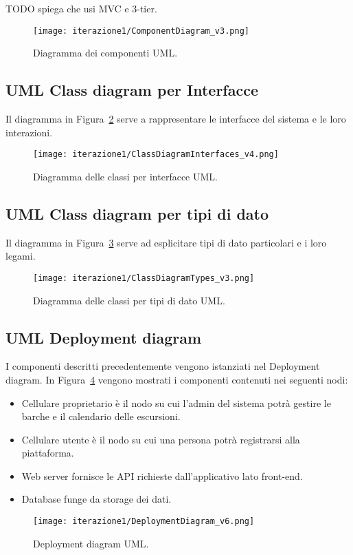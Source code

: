TODO spiega che usi MVC e 3-tier.

\begin{figure}[htbp]
    \texttt{[image: iterazione1/ComponentDiagram\_v3.png]}
    \centering
    \caption{Diagramma dei componenti UML.}\label{fig:componentDiagram}
\end{figure}

\newpage

\subsection{UML Class diagram per Interfacce}
Il diagramma in Figura~\ref{fig:ClassDiagramInterfaces} serve a rappresentare le interfacce del sistema e le loro interazioni.

\begin{figure}[htbp]
    \texttt{[image: iterazione1/ClassDiagramInterfaces\_v4.png]}
    \centering
    \caption{Diagramma delle classi per interfacce UML.}\label{fig:ClassDiagramInterfaces}
\end{figure}

\newpage

\subsection{UML Class diagram per tipi di dato}
Il diagramma in Figura~\ref{fig:ClassDiagramTypes} serve ad esplicitare tipi di dato particolari e i loro legami.

\begin{figure}[htbp]
    \texttt{[image: iterazione1/ClassDiagramTypes\_v3.png]}
    \centering
    \caption{Diagramma delle classi per tipi di dato UML.}\label{fig:ClassDiagramTypes}
\end{figure}

\subsection{UML Deployment diagram}
I componenti descritti precedentemente vengono istanziati nel Deployment diagram. In Figura~\ref{fig:DeploymentDiagram} vengono mostrati i componenti contenuti nei seguenti nodi:

\begin{itemize}
    \item Cellulare proprietario è il nodo su cui l'admin del sistema potrà gestire le barche e il calendario delle escursioni.
    \item Cellulare utente è il nodo su cui una persona potrà registrarsi alla piattaforma.
    \item Web server fornisce le API richieste dall'applicativo lato front-end.
    \item Database funge da storage dei dati.
\end{itemize}

\begin{figure}[htbp]
    \texttt{[image: iterazione1/DeploymentDiagram\_v6.png]}
    \centering
    \caption{Deployment diagram UML.}\label{fig:DeploymentDiagram}
\end{figure}